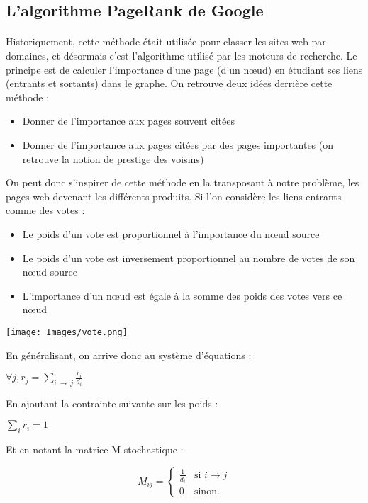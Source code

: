 \documentclass[14pt, openany]{article}
\begin{document}
\subsection{L'algorithme PageRank de Google}
\paragraph{}
Historiquement, cette méthode était utilisée pour classer les sites web par domaines, et désormais c'est l'algorithme utilisé par les moteurs de recherche. Le principe est de calculer l'importance d'une page (d'un nœud) en étudiant ses liens (entrants et sortants) dans le graphe. On retrouve deux idées derrière cette méthode :
\begin{itemize}
\item Donner de l'importance aux pages souvent citées
\item Donner de l'importance aux pages citées par des pages importantes (on retrouve la notion de prestige des voisins)
\end{itemize}
On peut donc s'inspirer de cette méthode en la transposant à notre problème, les pages web devenant les différents produits. Si l'on considère les liens entrants comme des votes :
\begin{itemize}
\item Le poids d'un vote est proportionnel à l'importance du nœud source
\item Le poids d'un vote est inversement proportionnel au nombre de votes de son nœud source
\item L'importance d'un nœud est égale à la somme des poids des votes vers ce nœud
\end{itemize}
\begin{center}
\texttt{[image: Images/vote.png]}
\label{fig1}
\end{center}
En généralisant, on arrive donc au système d'équations :
\begin{center}
$\forall j, r_j=\sum\limits_{i~\rightarrow~j}\frac{r_i}{d_i}$
\end{center}
En ajoutant la contrainte suivante sur les poids :
\begin{center}
$\sum\limits_{i}r_i = 1$
\end{center}
Et en notant la matrice M stochastique :
\begin{center}
$$
M_{ij} = \left\{
    \begin{array}{ll}
        \frac{1}{d_i} & \mbox{si } i \rightarrow j \\
        0 & \mbox{sinon.}
    \end{array}
\right.
$$
\end{center}
\end{document}
